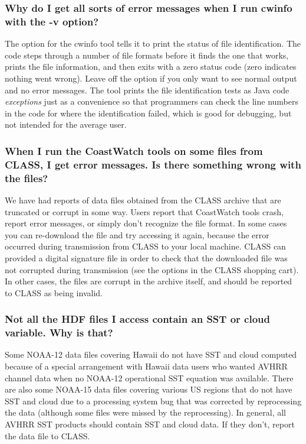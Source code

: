 \subsubsection*{Why do I get all sorts of error messages when I run cwinfo with the -v option?}

The  option for the cwinfo tool tells it to print the
status of file identification.  The code steps through a number of
file formats before it finds the one that works, prints the file
information, and then exits with a zero status code (zero indicates
nothing went wrong).  Leave off the  option if you only
want to see normal output and no error messages.  The tool prints the
file identification tests as Java code {\em exceptions} just as a
convenience so that programmers can check the line numbers in the code
for where the identification failed, which is good for debugging, but
not intended for the average user.

\subsubsection*{When I run the CoastWatch tools on some files from CLASS, I get error messages.  Is there something wrong with the files?}

We have had reports of data files obtained from the CLASS archive that
are truncated or corrupt in some way.  Users report that CoastWatch
tools crash, report error messages, or simply don't recognize the file
format.  In some cases you can re-download the file and try accessing
it again, because the error occurred during transmission from CLASS to
your local machine.  CLASS can provided a digital signature file in
order to check that the downloaded file was not corrupted during
transmission (see the options in the CLASS shopping cart).  In other
cases, the files are corrupt in the archive itself, and should be
reported to CLASS as being invalid.

\subsubsection*{Not all the HDF files I access contain an SST or cloud variable.  Why is that?}

Some NOAA-12 data files covering Hawaii do not have SST and cloud
computed because of a special arrangement with Hawaii data users who
wanted AVHRR channel data when no NOAA-12 operational SST equation was
available.  There are also some NOAA-15 data files covering various US
regions that do not have SST and cloud due to a processing system bug
that was corrected by reprocessing the data (although some files were
missed by the reprocessing).  In general, all AVHRR SST products
should contain SST and cloud data.  If they don't, report the data
file to CLASS.

